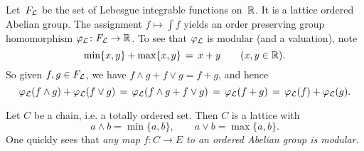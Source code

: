\documentclass[main.tex]{subfiles}
\begin{document}
%
%
\begin{ex}
\label{E:int-val}
Let~$F_{\mathcal{L}}$ be the set of Lebesgue integrable functions on~$\mathbb{R}$.
It is a lattice ordered Abelian group.
The assignment $f\mapsto \int f$ 
yields an order preserving group homomorphism
$\varphi_{\mathcal{L}}\colon F_{\mathcal{L}}\rightarrow \mathbb{R}$.
To see that $\varphi_{\mathcal{L}}$ is modular (and a valuation),
note
\begin{equation*}
\min\{x,y\}+\max\{x,y\} \,=\, x+y\qquad(x,y\in \mathbb{R}).
\end{equation*}
So given $f,g\in F_{\mathcal{L}}$,
we have $f\wedge g + f \vee g = f+ g$,
and hence
\begin{equation*}
\varphi_{\mathcal{L}}(f\wedge g) + \varphi_{\mathcal{L}}(f\vee g) 
\,=\,\varphi_{\mathcal{L}}(f\wedge g + f\vee g)
\,=\, \varphi_{\mathcal{L}}(f+g)
\,=\, \varphi_{\mathcal{L}} (f)+\varphi_{\mathcal{L}}(g).
\end{equation*}
\end{ex}

%
%
\begin{ex}
Let $C$ be a chain,
i.e. a totally ordered set.
Then $C$ is a lattice with
\begin{equation*}
a\wedge b = \min\{a,b\},
 \qquad 
a\vee b = \max\{a,b\}.
\end{equation*}
One quickly sees that
\emph{any map $f\colon C\rightarrow E$
to an ordered Abelian group is modular.}
\end{ex}
\end{document}
